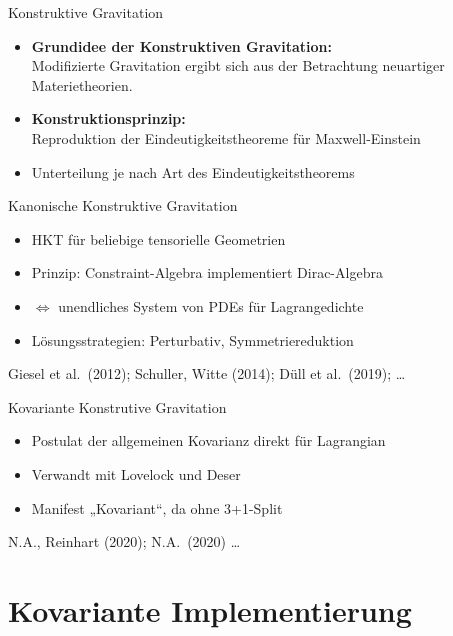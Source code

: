\documentclass{beamer}
\begin{document}
    \begin{frame}{Konstruktive Gravitation}
        \begin{itemize}
            \item \textbf{Grundidee der Konstruktiven Gravitation:} \\
            Modifizierte Gravitation ergibt sich aus der Betrachtung neuartiger Materietheorien.
            \item \textbf{Konstruktionsprinzip:} \\
            Reproduktion der Eindeutigkeitstheoreme für Maxwell-Einstein
            \item Unterteilung je nach Art des Eindeutigkeitstheorems
        \end{itemize}
    \end{frame}

    \begin{frame}{Kanonische Konstruktive Gravitation}
        \begin{itemize}
            \item HKT für beliebige tensorielle Geometrien
            \item Prinzip: Constraint-Algebra implementiert Dirac-Algebra
            \item $\Leftrightarrow$ unendliches System von PDEs für Lagrangedichte
            \item Lösungsstrategien: Perturbativ, Symmetriereduktion
        \end{itemize}

        \raggedleft\scriptsize \lbrack Giesel et al.\ (2012); Schuller, Witte (2014); Düll et al.\ (2019); \ldots \rbrack
    \end{frame}

    \begin{frame}{Kovariante Konstrutive Gravitation}
        \begin{itemize}
            \item Postulat der allgemeinen Kovarianz direkt für Lagrangian
            \item Verwandt mit Lovelock und Deser
            \item Manifest „Kovariant“, da ohne 3+1-Split
        \end{itemize}

        \raggedleft\scriptsize \lbrack N.A., Reinhart (2020); N.A.\ (2020) \ldots \rbrack
    \end{frame}


    \section{Kovariante Implementierung}\label{sec:covariant-constructive-gravity}
\end{document}
